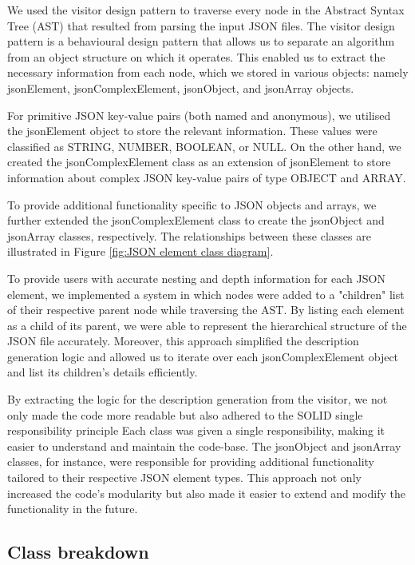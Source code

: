 \documentclass{l4proj}
\begin{document}
We used the visitor design pattern \cite{hunt2013gang} to traverse every node in the Abstract Syntax Tree (AST) that resulted from parsing the input JSON files. The visitor design pattern is a behavioural design pattern that allows us to separate an algorithm from an object structure on which it operates. This enabled us to extract the necessary information from each node, which we stored in various objects: namely jsonElement, jsonComplexElement, jsonObject, and jsonArray objects.

For primitive JSON key-value pairs (both named and anonymous), we utilised the jsonElement object to store the relevant information. These values were classified as STRING, NUMBER, BOOLEAN, or NULL. On the other hand, we created the jsonComplexElement class as an extension of jsonElement to store information about complex JSON key-value pairs of type OBJECT and ARRAY.

To provide additional functionality specific to JSON objects and arrays, we further extended the jsonComplexElement class to create the jsonObject and jsonArray classes, respectively. The relationships between these classes are illustrated in Figure \ref{fig:JSON element class diagram}.

To provide users with accurate nesting and depth information for each JSON element, we implemented a system in which nodes were added to a "children" list of their respective parent node while traversing the AST. By listing each element as a child of its parent, we were able to represent the hierarchical structure of the JSON file accurately. Moreover, this approach simplified the description generation logic and allowed us to iterate over each jsonComplexElement object and list its children's details efficiently.

By extracting the logic for the description generation from the visitor, we not only made the code more readable but also adhered to the SOLID single responsibility principle \cite{martin2000design} Each class was given a single responsibility, making it easier to understand and maintain the code-base. The jsonObject and jsonArray classes, for instance, were responsible for providing additional functionality tailored to their respective JSON element types. This approach not only increased the code's modularity but also made it easier to extend and modify the functionality in the future.

\subsection{Class breakdown}
\end{document}
